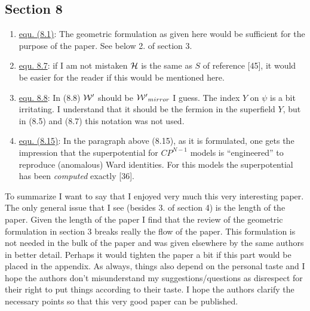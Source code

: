 \documentclass[a4paper,12pt]{article}
\begin{document}
\subsection*{Section 8}

\begin{enumerate}

\item \underline{equ. (8.1)}: The geometric formulation as given here
would be sufficient for the purpose of the paper. See below 2. of
section 3.

\item \underline{equ. 8.7}: if I am not mistaken ${\cal{H}}$ is the
same as $S$ of reference [45], it would be easier for the reader if
this would be mentioned here.

\item \underline{equ. 8.8}: In (8.8) ${\cal W}{'}$ should be ${\cal
W}{'}_{mirror}$ I guess. The index $Y$ on $\psi$ is a bit irritating.
I understand that it should be the fermion in the superfield $Y$, but
in (8.5) and (8.7) this notation was not used.

\item \underline{equ. (8.15)}: In the paragraph above (8.15), as it is
formulated, one gets the impression that the superpotential for
$CP^{N-1}$ models is ``engineered'' to reproduce (anomalous) Ward
identities. For this models the superpotential has been
\emph{computed} exactly [36].

\end{enumerate}

To summarize I want to say that I enjoyed very much this very
interesting paper. The only general issue that I see (besides 3. of
section 4) is the length of the paper. Given the length of the paper I
find that the review of the geometric formulation in section 3 breaks
really the flow of the paper. This formulation is not needed in the
bulk of the paper and was given elsewhere by the same authors in
better detail. Perhaps it would tighten the paper a bit if this part
would be placed in the appendix. As always, things also depend on the
personal taste and I hope the authors don't misunderstand my
suggestions/questions as disrespect for their right to put things
according to their taste. I hope the authors clarify the necessary
points so that this very good paper can be published.
\end{document}

